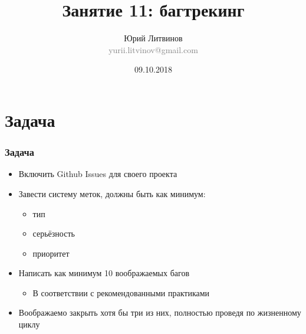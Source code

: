 \documentclass[xetex,mathserif,serif]{beamer}
\title{Занятие 11: багтрекинг}
\author[Юрий Литвинов]{Юрий Литвинов\\\small{\textcolor{gray}{yurii.litvinov@gmail.com}}}
\date{09.10.2018}
\begin{document}
	\frame{\titlepage}

	\section{Задача}

	\begin{frame}
		\frametitle{Задача}
		\begin{itemize}
			\item Включить Github Issues для своего проекта
			\item Завести систему меток, должны быть как минимум:
			\begin{itemize}
				\item тип
				\item серьёзность
				\item приоритет
			\end{itemize}
			\item Написать как минимум 10 воображаемых багов
			\begin{itemize}
				\item В соответствии с рекомендованными практиками
			\end{itemize}
			\item Воображаемо закрыть хотя бы три из них, полностью проведя по жизненному циклу
		\end{itemize}
	\end{frame}
\end{document}
